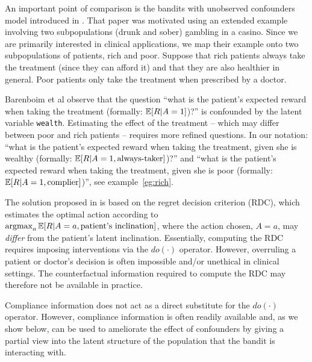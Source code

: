 An important point of comparison is the bandits with unobserved confounders model introduced in \cite{bareinboim:15}. That paper was motivated using an extended example involving two subpopulations (drunk and sober) gambling in a casino. Since we are primarily interested in clinical applications, we map their example onto two subpopulations of patients, rich and poor. Suppose that rich patients always take the treatment (since they can afford it) and that they are also healthier in general. Poor patients only take the treatment when prescribed by a doctor.

Barenboim et al observe that the question ``what is the patient's expected reward when taking the treatment (formally: $\operatorname*{\mathbb E}[R|{A=1}]$)?'' is confounded by the latent variable \texttt{wealth}. Estimating the effect of the treatment -- which may differ between poor and rich patients -- requires more refined questions. In our notation: 
``what is the patient's expected reward when taking the treatment, given she is wealthy (formally: $\operatorname*{\mathbb E}[R|{A=1}, \text{always-taker}]$)?'' and  ``what is the patient's expected reward when taking the treatment, given she is poor (formally: $\operatorname*{\mathbb E}[R|{A=1}, \text{complier}]$)'', see example~\ref{eg:rich}.

The solution proposed in \cite{bareinboim:15} is based on the regret decision criterion (RDC), which estimates the optimal action according to $\operatorname*{argmax}_{a}\operatorname*{\mathbb E}[R|A=a,\text{patient's inclination}]$, where the action chosen, $A=a$, may \emph{differ} from the patient's latent inclination. Essentially, computing the RDC requires imposing interventions via the $do(\cdot)$ operator. However, overruling a patient or doctor's decision is often impossible and/or unethical in clinical settings. The counterfactual information required to compute the RDC may therefore not be available in practice.

Compliance information does not act as a direct substitute for the $do(\cdot)$ operator. However, compliance information is often readily available and, as we show below, can be used to ameliorate the effect of confounders by giving a partial view into the latent structure of the population that the bandit is interacting with.









